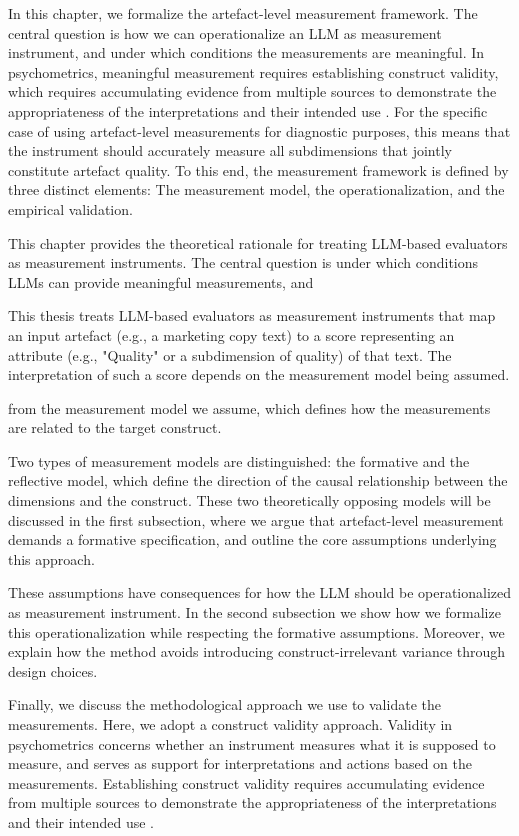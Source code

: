 In this chapter, we formalize the artefact-level measurement framework. The central question is how we can operationalize an LLM as measurement instrument, and under which conditions the measurements are meaningful. In psychometrics, meaningful measurement requires establishing construct validity, which requires accumulating evidence from multiple sources to demonstrate the appropriateness of the interpretations and their intended use \citep{messick1989meaning}. For the specific case of using artefact-level measurements for diagnostic purposes, this means that the instrument should accurately measure all subdimensions that jointly constitute artefact quality. To this end, the measurement framework is defined by three distinct elements: The measurement model, the operationalization, and the empirical validation.

This chapter provides the theoretical rationale for treating LLM-based evaluators as measurement instruments. The central question is under which conditions LLMs can provide meaningful measurements, and 

This thesis treats LLM-based evaluators as measurement instruments that map an input artefact (e.g., a marketing copy text) to a score representing an attribute (e.g., "Quality" or a subdimension of quality) of that text. The interpretation of such a score depends on the measurement model being assumed. 



from the measurement model  we assume, which defines how the measurements are related to the target construct. 

Two types of measurement models are distinguished: the formative and the reflective model, which define the direction of the causal relationship between the dimensions and the construct. These two theoretically opposing models will be discussed in the first subsection, where we argue that artefact-level measurement demands a formative specification, and outline the core assumptions underlying this approach.

These assumptions have consequences for how the LLM should be operationalized as measurement instrument. In the second subsection we show how we formalize this operationalization while respecting the formative assumptions. Moreover, we explain how the method avoids introducing construct-irrelevant variance through design choices. 

Finally, we discuss the methodological approach we use to validate the measurements. Here, we adopt a construct validity approach. Validity in psychometrics concerns whether an instrument measures what it is supposed to measure, and serves as support for interpretations
and actions based on the measurements. Establishing construct validity requires accumulating evidence from multiple sources to demonstrate the appropriateness of the interpretations and their intended use \citep{messick1989meaning}. 



